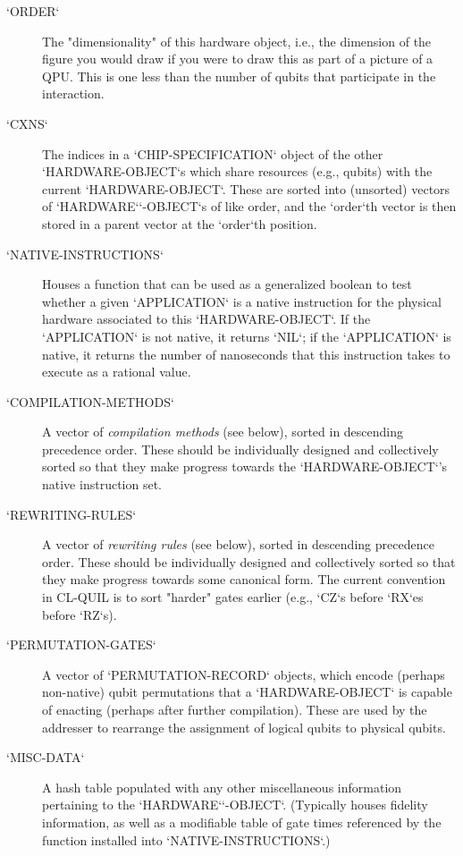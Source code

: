 \begin{description}
	\item[`ORDER`] The "dimensionality" of this hardware object, i.e., the dimension of the figure you would draw if you were to draw this as part of a picture of a QPU.  This is one less than the number of qubits that participate in the interaction.
	\item[`CXNS`] The indices in a `CHIP-SPECIFICATION` object of the other `HARDWARE-OBJECT`s which share resources (e.g., qubits) with the current `HARDWARE-OBJECT`.  These are sorted into (unsorted) vectors of `HARDWARE`\-`-OBJECT`s of like order, and the `order`th vector is then stored in a parent vector at the `order`th position.
	\item [`NATIVE-INSTRUCTIONS`] Houses a function that can be used as a generalized boolean to test whether a given `APPLICATION` is a native instruction for the physical hardware associated to this `HARDWARE-OBJECT`.  If the `APPLICATION` is not native, it returns `NIL`; if the `APPLICATION` is native, it returns the number of nanoseconds that this instruction takes to execute as a rational value.
	\item[`COMPILATION-METHODS`] A vector of \textit{compilation methods} (see below), sorted in descending precedence order.  These should be individually designed and collectively sorted so that they make progress towards the `HARDWARE-OBJECT`'s native instruction set.
	\item[`REWRITING-RULES`] A vector of \textit{rewriting rules} (see below), sorted in descending precedence order.  These should be individually designed and collectively sorted so that they make progress towards some canonical form.  The current convention in CL-QUIL is to sort "harder" gates earlier (e.g., `CZ`s before `RX`es before `RZ`s).
	\item[`PERMUTATION-GATES`] A vector of `PERMUTATION-RECORD` objects, which encode (perhaps non-native) qubit permutations that a `HARDWARE-OBJECT` is capable of enacting (perhaps after further compilation).  These are used by the addresser to rearrange the assignment of logical qubits to physical qubits.
	\item[`MISC-DATA`] A hash table populated with any other miscellaneous information pertaining to the `HARDWARE`\-`-OBJECT`.  (Typically houses fidelity information, as well as a modifiable table of gate times referenced by the function installed into `NATIVE-INSTRUCTIONS`.)
\end{description}

